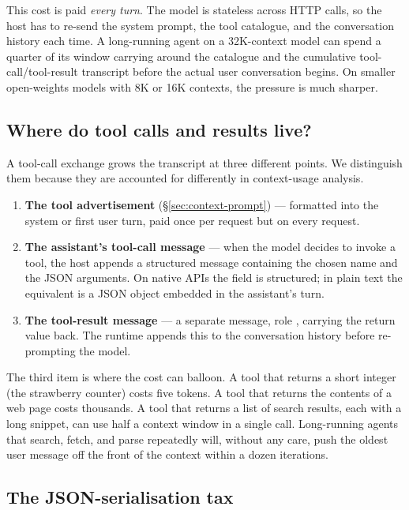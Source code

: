 This cost is paid \emph{every turn}. The model is stateless across
HTTP calls, so the host has to re-send the system prompt, the tool
catalogue, and the conversation history each time. A long-running
agent on a 32K-context model can spend a quarter of its window
carrying around the catalogue and the cumulative
tool-call/tool-result transcript before the actual user
conversation begins. On smaller open-weights models with 8K or 16K
contexts, the pressure is much sharper.

\subsection{Where do tool calls and results live?}
\label{sec:context-transcript}

A tool-call exchange grows the transcript at three different points.
We distinguish them because they are accounted for differently in
context-usage analysis.

\begin{enumerate}[label=(\roman*)]
\item \textbf{The tool advertisement} (\S\ref{sec:context-prompt})
  --- formatted into the system or first user turn, paid once per
  request but on every request.
\item \textbf{The assistant's tool-call message} --- when the model
  decides to invoke a tool, the host appends a structured
   message containing the chosen name and the JSON
  arguments. On native APIs the field is structured; in plain text
  the equivalent is a JSON object embedded in the assistant's turn.
\item \textbf{The tool-result message} --- a separate message, role
  , carrying the return value back. The runtime appends
  this to the conversation history before re-prompting the model.
\end{enumerate}

\noindent
The third item is where the cost can balloon. A tool that returns a
short integer (the strawberry counter) costs five tokens. A tool
that returns the contents of a web page costs thousands. A tool that
returns a list of search results, each with a long snippet, can use
half a context window in a single call. Long-running agents that
search, fetch, and parse repeatedly will, without any care, push the
oldest user message off the front of the context within a dozen
iterations.

\subsection{The JSON-serialisation tax}
\label{sec:context-json}

